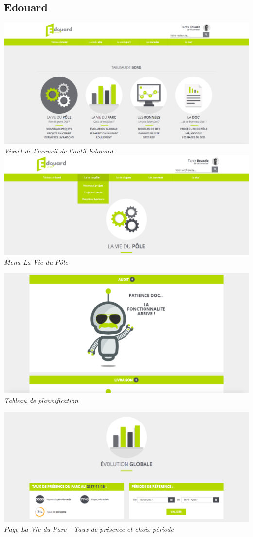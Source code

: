 \documentclass[12pt]{article}
\begin{document}
\begin{appendix}
\chapter{Edouard}
    \begin{center}
    \includegraphics[width = 15cm]{accueilEdouard.png}
    \textit{Visuel de l'accueil de l'outil Edouard}
    \includegraphics[width = 15cm]{viePole.png}
    \textit{Menu La Vie du Pôle}
    
    \includegraphics[width = 15cm]{viePole2.png}
    \textit{Tableau de plannification}
    
    \includegraphics[width = 15cm]{vieParc.png}
    \textit{Page La Vie du Parc - Taux de présence et choix période}
    

\end{center}
\end{appendix}
\end{document}
